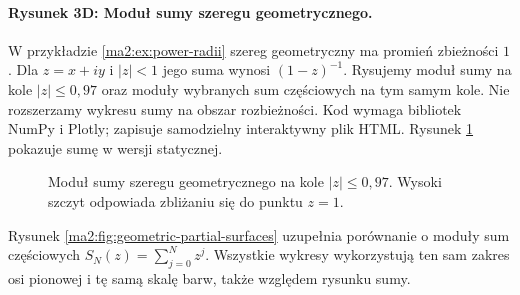 \paragraph{Rysunek 3D: Moduł sumy szeregu geometrycznego.}
W przykładzie \ref{ma2:ex:power-radii} szereg
geometryczny ma promień zbieżności $1$. Dla $z=x+iy$
i $|z|<1$ jego suma wynosi $(1-z)^{-1}$.
Rysujemy moduł sumy na kole $|z|\le0{,}97$ oraz
moduły wybranych sum częściowych na tym samym kole.
Nie rozszerzamy wykresu sumy na obszar rozbieżności.
Kod wymaga bibliotek NumPy i Plotly; zapisuje samodzielny
interaktywny plik HTML.
Rysunek \ref{ma2:fig:geometric-modulus} pokazuje sumę w wersji statycznej.

\begin{figure}[htbp]
\centering
{}
\caption{Moduł sumy szeregu geometrycznego na kole $|z|\le0{,}97$. Wysoki szczyt odpowiada zbliżaniu się do punktu $z=1$.}
\label{ma2:fig:geometric-modulus}
\end{figure}

Rysunek \ref{ma2:fig:geometric-partial-surfaces} uzupełnia porównanie
o moduły sum częściowych $S_N(z)=\sum_{j=0}^N z^j$.
Wszystkie wykresy wykorzystują ten sam zakres osi pionowej
i tę samą skalę barw, także względem rysunku sumy.

